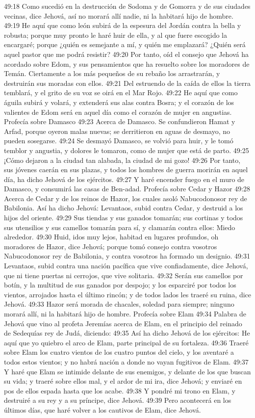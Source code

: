 49:18 Como sucedió en la destrucción de Sodoma y de Gomorra y de sus ciudades vecinas, dice Jehová, así no morará allí nadie, ni la habitará hijo de hombre. 
49:19 He aquí que como león subirá de la espesura del Jordán contra la bella y robusta; porque muy pronto le haré huir de ella, y al que fuere escogido la encargaré; porque ¿quién es semejante a mí, y quién me emplazará? ¿Quién será aquel pastor que me podrá resistir? 
49:20 Por tanto, oíd el consejo que Jehová ha acordado sobre Edom, y sus pensamientos que ha resuelto sobre los moradores de Temán. Ciertamente a los más pequeños de su rebaño los arrastrarán, y destruirán sus moradas con ellos. 
49:21 Del estruendo de la caída de ellos la tierra temblará, y el grito de su voz se oirá en el Mar Rojo. 
49:22 He aquí que como águila subirá y volará, y extenderá sus alas contra Bosra; y el corazón de los valientes de Edom será en aquel día como el corazón de mujer en angustias. 
Profecía sobre Damasco 
49:23 Acerca de Damasco. Se confundieron Hamat y Arfad, porque oyeron malas nuevas; se derritieron en aguas de desmayo, no pueden sosegarse. 
49:24 Se desmayó Damasco, se volvió para huir, y le tomó temblor y angustia, y dolores le tomaron, como de mujer que está de parto. 
49:25 ¡Cómo dejaron a la ciudad tan alabada, la ciudad de mi gozo! 
49:26 Por tanto, sus jóvenes caerán en sus plazas, y todos los hombres de guerra morirán en aquel día, ha dicho Jehová de los ejércitos. 
49:27 Y haré encender fuego en el muro de Damasco, y consumirá las casas de Ben-adad. 
Profecía sobre Cedar y Hazor 
49:28 Acerca de Cedar y de los reinos de Hazor, los cuales asoló Nabucodonosor rey de Babilonia. Así ha dicho Jehová: Levantaos, subid contra Cedar, y destruid a los hijos del oriente. 
49:29 Sus tiendas y sus ganados tomarán; sus cortinas y todos sus utensilios y sus camellos tomarán para sí, y clamarán contra ellos: Miedo alrededor. 
49:30 Huid, idos muy lejos, habitad en lugares profundos, oh moradores de Hazor, dice Jehová; porque tomó consejo contra vosotros Nabucodonosor rey de Babilonia, y contra vosotros ha formado un designio. 
49:31 Levantaos, subid contra una nación pacífica que vive confiadamente, dice Jehová, que ni tiene puertas ni cerrojos, que vive solitaria. 
49:32 Serán sus camellos por botín, y la multitud de sus ganados por despojo; y los esparciré por todos los vientos, arrojados hasta el último rincón; y de todos lados les traeré su ruina, dice Jehová. 
49:33 Hazor será morada de chacales, soledad para siempre; ninguno morará allí, ni la habitará hijo de hombre. 
Profecía sobre Elam 
49:34 Palabra de Jehová que vino al profeta Jeremías acerca de Elam, en el principio del reinado de Sedequías rey de Judá, diciendo: 
49:35 Así ha dicho Jehová de los ejércitos: He aquí que yo quiebro el arco de Elam, parte principal de su fortaleza. 
49:36 Traeré sobre Elam los cuatro vientos de los cuatro puntos del cielo, y los aventaré a todos estos vientos; y no habrá nación a donde no vayan fugitivos de Elam. 
49:37 Y haré que Elam se intimide delante de sus enemigos, y delante de los que buscan su vida; y traeré sobre ellos mal, y el ardor de mi ira, dice Jehová; y enviaré en pos de ellos espada hasta que los acabe. 
49:38 Y pondré mi trono en Elam, y destruiré a su rey y a su príncipe, dice Jehová. 
49:39 Pero acontecerá en los últimos días, que haré volver a los cautivos de Elam, dice Jehová. 
